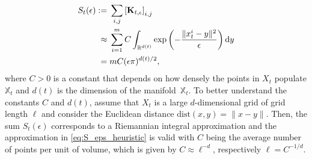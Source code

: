 \begin{equation}\label{eq:S_eps_heuristic}
    \begin{aligned}
        S_t(\epsilon) := \hspace{1mm} & \sum_{i,j}\left[\mathbf{K}_{t,\epsilon}\right]_{i,j}
        \\
        \approx \hspace{1mm}          & \sum_{i=1}^m C \int_{\mathbb{R}^{d(t)}} \exp \left(-\frac{\| x^i_t- y\|^2}{\epsilon} \right) \mathrm{d} y \\
        =\hspace{1mm}                 & mC (\epsilon \pi)^{d(t)/2},
    \end{aligned}
\end{equation}
\ignorespacesafterend
where $C>0$ is a constant that depends on how densely the points in $X_t$ populate $\mathbb{X}_t$ and $d(t)$ is the dimension of the manifold~$\mathbb{X}_t$. To better understand the constants $C$ and $d(t)$, assume that $X_t$ is a large $d$-dimensional grid of grid length $\ell$ and consider the Euclidean distance $\text{dist}(x,y) = \|x-y\|$. Then, the sum $S_t(\epsilon)$ corresponds to a Riemannian integral approximation and the approximation in \cref{eq:S_eps_heuristic} is valid with $C$ being the average number of points per unit of volume, which is given by $C\approx \ell^{-d}$, respectively $\ell = C^{-1/d}$.

